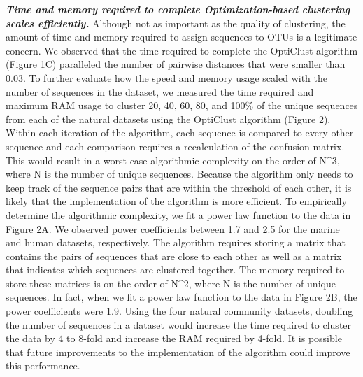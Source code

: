 \documentclass[11pt,]{article}
\begin{document}
\textbf{\emph{Time and memory required to complete Optimization-based
clustering scales efficiently.}} Although not as important as the
quality of clustering, the amount of time and memory required to assign
sequences to OTUs is a legitimate concern. We observed that the time
required to complete the OptiClust algorithm (Figure 1C) paralleled the
number of pairwise distances that were smaller than 0.03. To further
evaluate how the speed and memory usage scaled with the number of
sequences in the dataset, we measured the time required and maximum RAM
usage to cluster 20, 40, 60, 80, and 100\% of the unique sequences from
each of the natural datasets using the OptiClust algorithm (Figure 2).
Within each iteration of the algorithm, each sequence is compared to
every other sequence and each comparison requires a recalculation of the
confusion matrix. This would result in a worst case algorithmic
complexity on the order of N\^{}3, where N is the number of unique
sequences. Because the algorithm only needs to keep track of the
sequence pairs that are within the threshold of each other, it is likely
that the implementation of the algorithm is more efficient. To
empirically determine the algorithmic complexity, we fit a power law
function to the data in Figure 2A. We observed power coefficients
between 1.7 and 2.5 for the marine and human datasets, respectively. The
algorithm requires storing a matrix that contains the pairs of sequences
that are close to each other as well as a matrix that indicates which
sequences are clustered together. The memory required to store these
matrices is on the order of N\^{}2, where N is the number of unique
sequences. In fact, when we fit a power law function to the data in
Figure 2B, the power coefficients were 1.9. Using the four natural
community datasets, doubling the number of sequences in a dataset would
increase the time required to cluster the data by 4 to 8-fold and
increase the RAM required by 4-fold. It is possible that future
improvements to the implementation of the algorithm could improve this
performance.
\end{document}

